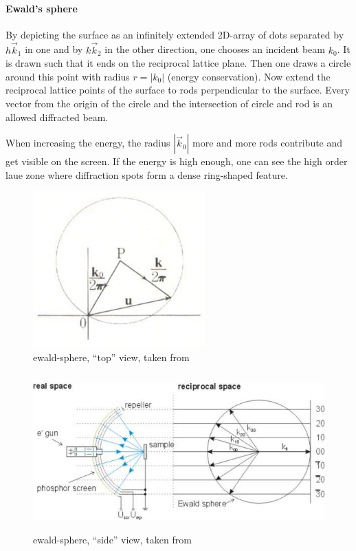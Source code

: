 \paragraph{Ewald's sphere}
By depicting the surface as an infinitely extended 2D-array of dots separated by $h\vec k_1$ in one and by $k\vec k_2$ in the other direction, one chooses an incident beam $k_0$. It is drawn such that it ends on the reciprocal lattice plane. Then one draws a circle around this point with radius $r=|k_0|$ (energy conservation). Now extend the reciprocal lattice points of the surface to rods perpendicular to the surface. Every vector from the origin of the circle and the intersection of circle and rod is an allowed diffracted beam. 

When increasing the energy, the radius $|\vec k_0|$ more and more rods contribute and get visible on the screen. If the energy is high enough, one can see the high order laue zone where diffraction spots form a dense ring-shaped feature.
\begin{figure}[h!]\label{ewald-sphere}
 \centering
 \includegraphics[height=6cm]{./images/ewald-sphere.jpg}
 \caption{ewald-sphere, ``top'' view, taken from \cite[109]{cowley_diffraction_1981}}
\end{figure}

\begin{figure}[h!]\label{LEED}
 \centering
 \includegraphics[height=6cm]{./images/ThreeGridLeed.jpg}
 \caption{ewald-sphere, ``side'' view, taken from \cite{threegridleed.jpg_2015}}
\end{figure}

